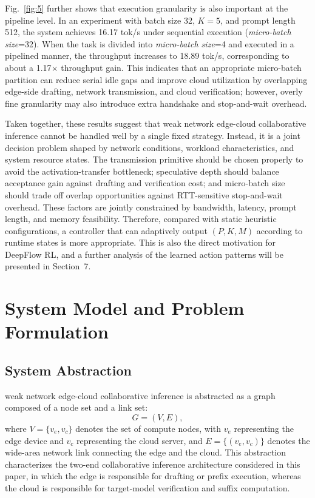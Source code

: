 \documentclass[a4paper,fleqn]{cas-dc}
\begin{document}
Fig.~\ref{fig:5} further shows that execution granularity is also important at the pipeline level. In an experiment with batch size 32, $K=5$, and prompt length 512, the system achieves 16.17 tok/s under sequential execution (\textit{micro-batch size}=32). When the task is divided into \textit{micro-batch size}=4 and executed in a pipelined manner, the throughput increases to 18.89 tok/s, corresponding to about a 1.17$\times$ throughput gain. This indicates that an appropriate micro-batch partition can reduce serial idle gaps and improve cloud utilization by overlapping edge-side drafting, network transmission, and cloud verification; however, overly fine granularity may also introduce extra handshake and stop-and-wait overhead.

Taken together, these results suggest that weak network edge-cloud collaborative inference cannot be handled well by a single fixed strategy. Instead, it is a joint decision problem shaped by network conditions, workload characteristics, and system resource states. The transmission primitive should be chosen properly to avoid the activation-transfer bottleneck; speculative depth should balance acceptance gain against drafting and verification cost; and micro-batch size should trade off overlap opportunities against RTT-sensitive stop-and-wait overhead. These factors are jointly constrained by bandwidth, latency, prompt length, and memory feasibility. Therefore, compared with static heuristic configurations, a controller that can adaptively output $(P,K,M)$ according to runtime states is more appropriate. This is also the direct motivation for DeepFlow RL, and a further analysis of the learned action patterns will be presented in Section~7.

\section{System Model and Problem Formulation}

\subsection{System Abstraction}

weak network edge-cloud collaborative inference is abstracted as a graph composed of a node set and a link set:
\begin{equation}
G=(V,E),
\end{equation}
where $V=\{v_e,v_c\}$ denotes the set of compute nodes, with $v_e$ representing the edge device and $v_c$ representing the cloud server, and $E=\{(v_e,v_c)\}$ denotes the wide-area network link connecting the edge and the cloud. This abstraction characterizes the two-end collaborative inference architecture considered in this paper, in which the edge is responsible for drafting or prefix execution, whereas the cloud is responsible for target-model verification and suffix computation.
\end{document}
